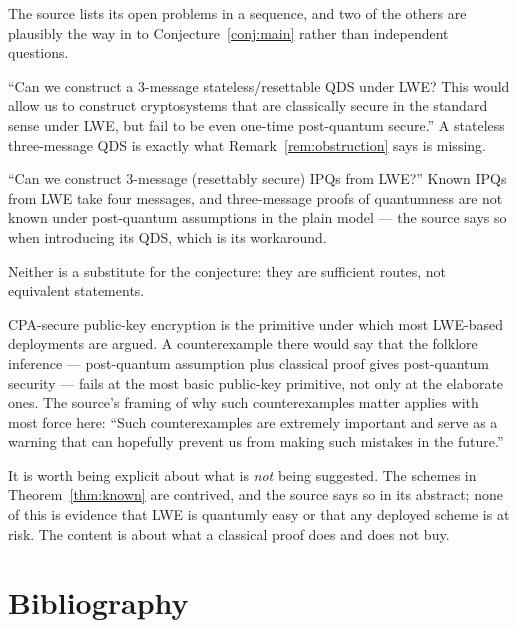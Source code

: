 \documentclass{aicr-conjecture}
\begin{document}
\begin{remark}\label{rem:routes}
The source lists its open problems in a sequence, and two of the others
are plausibly the way in to Conjecture~\ref{conj:main} rather than
independent questions.

``Can we construct a 3-message stateless/resettable QDS under LWE\@? This
would allow us to construct cryptosystems that are classically secure in
the standard sense under LWE, but fail to be even one-time post-quantum
secure.'' A stateless three-message QDS is exactly what
Remark~\ref{rem:obstruction} says is missing.

``Can we construct 3-message (resettably secure) IPQs from LWE?'' Known
IPQs from LWE take four messages, and three-message proofs of quantumness
are not known under post-quantum assumptions in the plain model --- the
source says so when introducing its QDS, which is its workaround.

Neither is a substitute for the conjecture: they are sufficient routes,
not equivalent statements.
\end{remark}

\begin{remark}\label{rem:meaning}
CPA-secure public-key encryption is the primitive under which most
LWE-based deployments are argued. A counterexample there would say that
the folklore inference --- post-quantum assumption plus classical proof
gives post-quantum security --- fails at the most basic public-key
primitive, not only at the elaborate ones. The source's framing of why
such counterexamples matter applies with most force here: ``Such
counterexamples are extremely important and serve as a warning that can
hopefully prevent us from making such mistakes in the future.''

It is worth being explicit about what is \emph{not} being suggested. The
schemes in Theorem~\ref{thm:known} are contrived, and the source says so
in its abstract; none of this is evidence that LWE is quantumly easy or
that any deployed scheme is at risk. The content is about what a
classical proof does and does not buy.
\end{remark}

\section{Bibliography}
\end{document}
